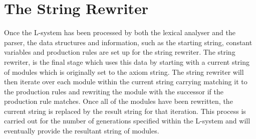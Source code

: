 \section{The String Rewriter}

Once the L-system has been processed by both the lexical analyser and the parser, the data structures and information, such as the starting string, constant variables and production rules are set up for the string rewriter. The string rewriter, is the final stage which uses this data by starting with a current string of modules which is originally set to the axiom string. The string rewriter will then iterate over each module within the current string carrying matching it to the production rules and rewriting the module with the successor if the production rule matches. Once all of the modules have been rewritten, the current string is replaced by the result string for that iteration. This process is carried out for the number of generations specified within the L-system and will eventually provide the resultant string of modules.

